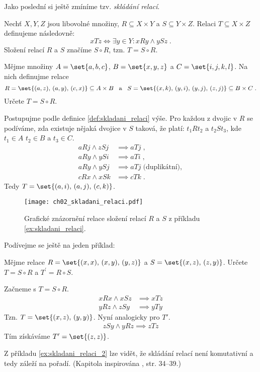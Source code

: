 Jako poslední si ještě zmíníme tzv. \emph{skládání relací}.
\begin{definition}\label{def:skladani_relaci}
    Nechť $X,Y,Z$ jsou libovolné množiny, $R\subseteq X\times Y$ a $S\subseteq Y\times Z$. Relaci $T\subseteq X\times Z$ definujeme následovně:
    \begin{equation*}
        xTz \iff \exists y\in Y : xRy \land ySz\; .
    \end{equation*}
    Složení relací $R$ a $S$ značíme $S\circ R$, tzn. $T=S\circ R$.
\end{definition}
\begin{example}\label{ex:skladani_relaci}
    Mějme množiny $A=\set{a,b,c}$, $B=\set{x,y,z}$ a $C=\set{i,j,k,l}$. Na nich definujme relace
    \begin{equation*}
        R=\set{(a,z),\,(a,y),\,(c,x)}\subseteq A\times B\;\;\;\text{a}\;\;\;S=\set{(x,k),\,(y,i),\,(y,j),\,(z,j)}\subseteq B\times C\; .
    \end{equation*}
    Určete $T=S\circ R$.
\end{example}
\begin{solution}
    Postupujme podle definice \ref{def:skladani_relaci} výše. Pro každou z dvojic v $R$ se podíváme, zda existuje nějaká dvojice v $S$ taková, že platí: $t_1Rt_2$ a $t_2St_3$, kde $t_1\in A$ $t_2\in B$ a $t_3\in C$.
    \begin{align*}
        aRj \land zSj &\implies aTj\; ,\\
        aRy \land ySi &\implies aTi\; ,\\
        aRy \land ySj &\implies aTj\;\text{(duplikátní)},\\
        cRx \land xSk &\implies cTk\; .
    \end{align*}
    Tedy $T=\set{(a,i),\,(a,j),\,(c,k)}$.
\end{solution}
\begin{figure}[h]
    \centering
    \texttt{[image: ch02\_skladani\_relaci.pdf]}
    \caption{Grafické znázornění relace složení relací $R$ a $S$ z příkladu \ref{ex:skladani_relaci}.}
    \label{fig:relace_mezi_mnozinami}
\end{figure}
Podívejme se ještě na jeden příklad:
\begin{example}\label{ex:skladani_relaci_2}
    Mějme relace $R=\set{(x,x),\,(x,y),\,(y,z)}$ a $S=\set{(x,z),\,(z,y)}$. Určete $T=S\circ R$ a $T^\prime=R\circ S$.
\end{example}
\begin{solution}
    Začneme s $T=S\circ R$.
    \begin{align*}
        xRx \land xSz &\implies xTz\\
        yRz \land zSy &\implies yTy
    \end{align*}
    Tzn. $T=\set{(x,z),\,(y,y)}$. Nyní analogicky pro $T\prime$.
    \begin{align*}
        zSy \land yRz \implies zTz
    \end{align*}
    Tím získáváme $T^\prime=\set{(z,z)}$.
\end{solution}
Z příkladu \ref{ex:skladani_relaci_2} lze vidět, že skládání relací není komutativní a tedy záleží na pořadí.
(Kapitola inspirována \cite{MatousekNesetril2009}, str. 34--39.)

